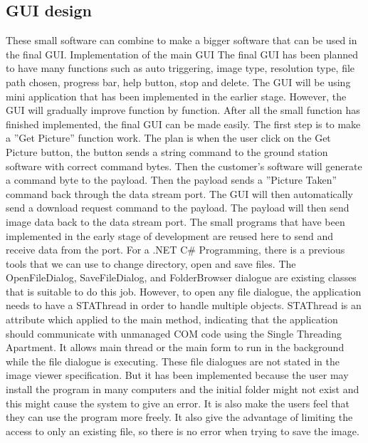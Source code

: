\documentclass[oneside]{ecsgdp}         %
\begin{document}
\subsection{GUI design}
These small software can combine to make a bigger software that can be used in the final GUI.
Implementation of the main GUI
The final GUI has been planned to have many functions such as auto triggering, image type, resolution type, file path chosen, progress bar, help button, stop and delete. The GUI will be using mini application that has been implemented in the earlier stage. However, the GUI will gradually improve function by function. After all the small function has finished implemented, the final GUI can be made easily.  
The first step is to make a ''Get Picture'' function work. The plan is when the user click on the Get Picture button, the button sends a string command to the ground station software with correct command bytes. Then the customer's software will generate a command byte to the payload. Then the payload sends a ''Picture Taken'' command back through the data stream port. The GUI will then automatically send a download request command to the payload. The payload will then send image data back to the data stream port. The small programs that have been implemented in the early stage of development are reused here to send and receive data from the port. 
For a .NET C\# Programming, there is a previous tools that we can use to change directory, open and save files. The OpenFileDialog,  SaveFileDialog, and FolderBrowser dialogue are existing classes that is suitable to do this job. However, to open any file dialogue, the application needs to have a STAThread in order to handle multiple objects. STAThread is an attribute which applied to the main method, indicating that the application should communicate with unmanaged COM code using the Single Threading Apartment. It allows main thread or the main form to run in the background while the file dialogue is executing. 
These file dialogues are not stated in the image viewer specification. But it has been implemented because the user may install the program in many computers and the initial folder might not exist and this might cause the system to give an error. It is also make the users feel that they can use the program more freely.  It also give the advantage of limiting the access to only an existing file, so there is no error when trying to save the image.
\end{document}

